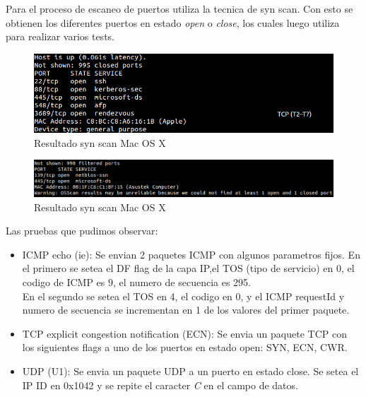 \documentclass[a4paper]{article}
\begin{document}
Para el proceso de escaneo de puertos utiliza la tecnica de syn scan. Con esto se obtienen los diferentes puertos en estado \textit{open} o \textit{close}, los cuales luego utiliza para realizar varios tests.


\begin{figure}[H]
  \centering
  \includegraphics[scale=0.60]{graficos/macPorts.png}
  \caption{Resultado syn scan Mac OS X}
\end{figure}  

\begin{figure}[H]
  \centering
  \includegraphics[scale=0.60]{graficos/windowsPorts.png}
  \caption{Resultado syn scan Mac OS X}
\end{figure}  

Las pruebas que pudimos observar:

\begin{itemize}

\item ICMP echo (ie): Se envian 2 paquetes ICMP con algunos parametros fijos. En el primero se setea el DF flag de la capa IP,el TOS (tipo de servicio) en 0, el codigo de ICMP es 9, el numero de secuencia es 295.\\
En el segundo se setea el TOS en 4, el codigo en 0, y el ICMP requestId y numero de secuencia se incrementan en 1 de los valores del primer paquete.

\item TCP explicit congestion notification (ECN): Se envia un paquete TCP con los siguientes flags a uno de los puertos en estado open: SYN, ECN, CWR.

\item UDP (U1): Se envia un paquete UDP a un puerto en estado close. Se setea el IP ID en 0x1042 y se repite el caracter  \textit{C} en el campo de datos. 

\end{itemize}
\end{document}
